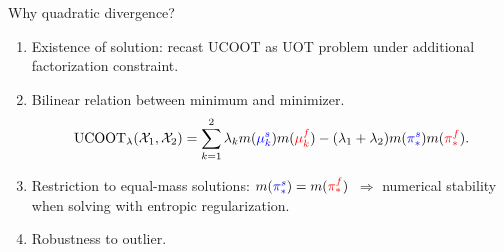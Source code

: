 \documentclass{beamer}
\newcommand{\ucoot}{\text{UCOOT}}
\newcommand{\cX}{\mathcal X}
\begin{document}
\begin{frame}{Why quadratic divergence?}
  \scriptsize
\begin{enumerate}
  \item Existence of solution: recast UCOOT as UOT problem under additional
  factorization constraint.
  \item Bilinear relation between minimum and minimizer.
  \begin{align*}
    \ucoot_{\lambda}(\cX_1, \cX_2) =
    \sum_{k=1}^2 \lambda_k m({\color{blue}{\mu_k^s}}) m({\color{red}{\mu_k^f}})
    - (\lambda_1 + \lambda_2) m({\color{blue}{\pi^s_*}}) m({\color{red}{\pi^f_*}}).
  \end{align*}
  \item Restriction to equal-mass solutions: $m({\color{blue}{\pi^s_*}}) = m({\color{red}{\pi^f_*}})$
  $\Rightarrow$ numerical stability when solving with entropic regularization.
  \item Robustness to outlier.
\end{enumerate}


\end{frame}
\end{document}
